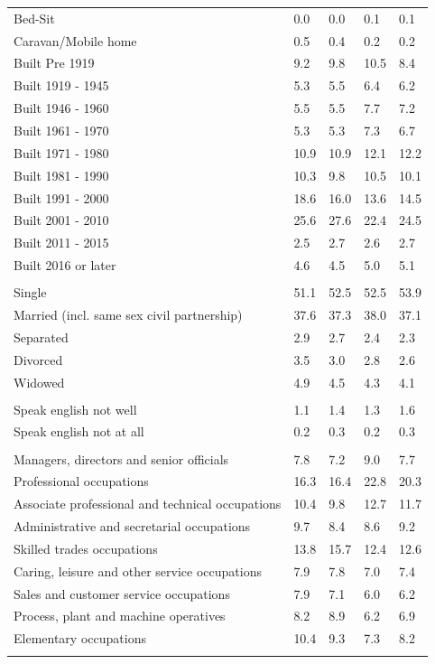\documentclass{article}
\begin{document}
\begin{table}[h]
\begin{tabular}{KTTTT}
Bed-Sit & 0.0& 0.0& 0.1& 0.1\\
Caravan/Mobile home & 0.5& 0.4& 0.2& 0.2\\
    \hline
Built Pre 1919 &  9.2&  9.8& 10.5&  8.4\\
Built 1919 - 1945 & 5.3& 5.5& 6.4& 6.2\\
Built  1946 - 1960 & 5.5& 5.5& 7.7& 7.2\\
Built  1961 - 1970 & 5.3& 5.3& 7.3& 6.7\\
Built  1971 - 1980 & 10.9& 10.9& 12.1& 12.2\\
Built  1981 - 1990 & 10.3&  9.8& 10.5& 10.1\\
Built  1991 - 2000 & 18.6& 16.0& 13.6& 14.5\\
Built  2001 - 2010 & 25.6& 27.6& 22.4& 24.5\\
Built  2011 - 2015 & 2.5& 2.7& 2.6& 2.7\\
Built  2016 or later & 4.6& 4.5& 5.0& 5.1\\
\hline
    \\
    \hline
Single & 51.1& 52.5& 52.5& 53.9\\
Married (incl. same sex civil partnership) & 37.6& 37.3& 38.0& 37.1\\
Separated  & 2.9& 2.7& 2.4& 2.3\\
Divorced  & 3.5& 3.0& 2.8& 2.6\\
Widowed & 4.9& 4.5& 4.3& 4.1\\
\hline
    \\ 
    \hline
Speak english not well & 1.1& 1.4& 1.3& 1.6\\
Speak english not at all & 0.2& 0.3& 0.2& 0.3\\
\hline
    \\
    \hline
Managers, directors and senior officials & 7.8& 7.2& 9.0& 7.7\\
Professional occupations & 16.3& 16.4& 22.8& 20.3\\
Associate professional and technical occupations & 10.4&  9.8& 12.7& 11.7\\
Administrative and secretarial occupations & 9.7& 8.4& 8.6& 9.2\\
Skilled trades occupations & 13.8& 15.7& 12.4& 12.6\\
Caring, leisure and other service occupations & 7.9& 7.8& 7.0& 7.4\\
Sales and customer service occupations & 7.9& 7.1& 6.0& 6.2\\
Process, plant and machine operatives & 8.2& 8.9& 6.2& 6.9\\
Elementary occupations & 10.4&  9.3&  7.3&  8.2\\
\hline
\end{tabular}
\end{table}
\end{document}
